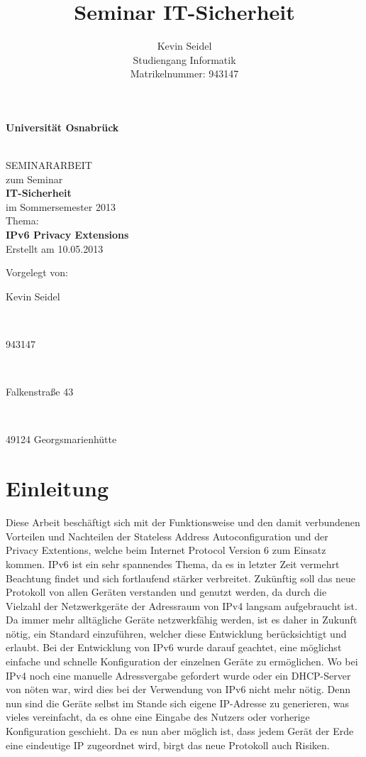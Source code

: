 \documentclass[a4paper, 12pt]{scrartcl}
\title{Seminar IT-Sicherheit}
\author{Kevin Seidel \\ Studiengang Informatik \\ Matrikelnummer: 943147}
\begin{document}
\begin{titlepage}
\begin{center}
\vspace*{1.5cm}
\begin{Large}
\textbf{Universität Osnabrück}
\end{Large}

\noindent\hrulefill
\\[3.5cm]
SEMINARARBEIT \\[1cm]
zum Seminar \\[1cm]
\textbf{IT-Sicherheit} \\[1.5cm]
im Sommersemester 2013 \\[1.5cm]
Thema: \\[0.5cm]
\textbf{IPv6 Privacy Extensions} \\[2cm]
Erstellt am 10.05.2013
\end{center}
\vfill
\begin{flushleft}
Vorgelegt von: 
\hfill \parbox{46mm}{Kevin Seidel} \\
\hfill \parbox{46mm}{943147} \\
\hfill \parbox{46mm}{Falkenstraße 43} \\
\hfill \parbox{46mm}{49124 Georgsmarienhütte}
\end{flushleft}
\end{titlepage}

\newpage

\setcounter{page}{2}
\tableofcontents

\newpage
{}
\setcounter{page}{1}

\section{Einleitung}
Diese Arbeit beschäftigt sich mit der Funktionsweise und den damit verbundenen Vorteilen und Nachteilen der Stateless Address Autoconfiguration und der Privacy Extentions, welche beim Internet Protocol Version 6 zum Einsatz kommen.
IPv6 ist ein sehr spannendes Thema, da es in letzter Zeit vermehrt Beachtung findet und sich fortlaufend stärker verbreitet. 
Zukünftig soll das neue Protokoll von allen Geräten verstanden und genutzt werden, da durch die Vielzahl der Netzwerkgeräte der Adressraum von IPv4 langsam aufgebraucht ist.
Da immer mehr alltägliche Geräte netzwerkfähig werden, ist es daher in Zukunft nötig, ein Standard einzuführen, welcher diese Entwicklung berücksichtigt und erlaubt.
Bei der Entwicklung von IPv6 wurde darauf geachtet, eine möglichst einfache und schnelle Konfiguration der einzelnen Geräte zu ermöglichen.
Wo bei IPv4 noch eine manuelle Adressvergabe gefordert wurde oder ein DHCP-Server von nöten war, wird dies bei der Verwendung von IPv6 nicht mehr nötig.
Denn nun sind die Geräte selbst im Stande sich eigene IP-Adresse zu generieren, was vieles vereinfacht, da es ohne eine Eingabe des Nutzers oder vorherige Konfiguration geschieht.
Da es nun aber möglich ist, dass jedem Gerät der Erde eine eindeutige IP zugeordnet wird, birgt das neue Protokoll auch Risiken.
\end{document}
